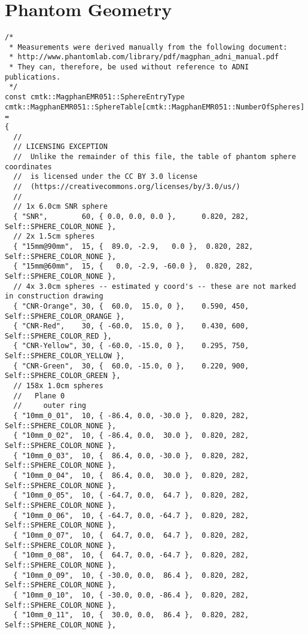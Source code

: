 \documentclass{InsightArticle}
\begin{document}
\section{Phantom Geometry}
\label{sec:PhantomGeometry}

{\small
\begin{verbatim}
/*
 * Measurements were derived manually from the following document: 
 * http://www.phantomlab.com/library/pdf/magphan_adni_manual.pdf
 * They can, therefore, be used without reference to ADNI publications.
 */
const cmtk::MagphanEMR051::SphereEntryType 
cmtk::MagphanEMR051::SphereTable[cmtk::MagphanEMR051::NumberOfSpheres] =
{
  // 
  // LICENSING EXCEPTION
  //  Unlike the remainder of this file, the table of phantom sphere coordinates
  //  is licensed under the CC BY 3.0 license
  //  (https://creativecommons.org/licenses/by/3.0/us/)
  //
  // 1x 6.0cm SNR sphere
  { "SNR",        60, { 0.0, 0.0, 0.0 },      0.820, 282, Self::SPHERE_COLOR_NONE }, 
  // 2x 1.5cm spheres
  { "15mm@90mm",  15, {  89.0, -2.9,   0.0 },  0.820, 282, Self::SPHERE_COLOR_NONE },
  { "15mm@60mm",  15, {   0.0, -2.9, -60.0 },  0.820, 282, Self::SPHERE_COLOR_NONE },
  // 4x 3.0cm spheres -- estimated y coord's -- these are not marked in construction drawing
  { "CNR-Orange", 30, {  60.0,  15.0, 0 },    0.590, 450, Self::SPHERE_COLOR_ORANGE },
  { "CNR-Red",    30, { -60.0,  15.0, 0 },    0.430, 600, Self::SPHERE_COLOR_RED },   
  { "CNR-Yellow", 30, { -60.0, -15.0, 0 },    0.295, 750, Self::SPHERE_COLOR_YELLOW },
  { "CNR-Green",  30, {  60.0, -15.0, 0 },    0.220, 900, Self::SPHERE_COLOR_GREEN }, 
  // 158x 1.0cm spheres
  //   Plane 0
  //     outer ring
  { "10mm_0_01",  10, { -86.4, 0.0, -30.0 },  0.820, 282, Self::SPHERE_COLOR_NONE },
  { "10mm_0_02",  10, { -86.4, 0.0,  30.0 },  0.820, 282, Self::SPHERE_COLOR_NONE },
  { "10mm_0_03",  10, {  86.4, 0.0, -30.0 },  0.820, 282, Self::SPHERE_COLOR_NONE },
  { "10mm_0_04",  10, {  86.4, 0.0,  30.0 },  0.820, 282, Self::SPHERE_COLOR_NONE }, 
  { "10mm_0_05",  10, { -64.7, 0.0,  64.7 },  0.820, 282, Self::SPHERE_COLOR_NONE },
  { "10mm_0_06",  10, { -64.7, 0.0, -64.7 },  0.820, 282, Self::SPHERE_COLOR_NONE },
  { "10mm_0_07",  10, {  64.7, 0.0,  64.7 },  0.820, 282, Self::SPHERE_COLOR_NONE },
  { "10mm_0_08",  10, {  64.7, 0.0, -64.7 },  0.820, 282, Self::SPHERE_COLOR_NONE },
  { "10mm_0_09",  10, { -30.0, 0.0,  86.4 },  0.820, 282, Self::SPHERE_COLOR_NONE },
  { "10mm_0_10",  10, { -30.0, 0.0, -86.4 },  0.820, 282, Self::SPHERE_COLOR_NONE },
  { "10mm_0_11",  10, {  30.0, 0.0,  86.4 },  0.820, 282, Self::SPHERE_COLOR_NONE },

\end{verbatim}}
\end{document}
